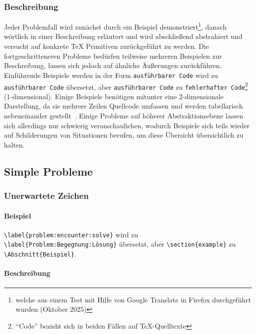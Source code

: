\subsubsection{Beschreibung}
Jeder Problemfall wird zunächst durch ein Beispiel demonstriert\footnote{welche aus einem Test mit Hilfe von Google Translate in Firefox durchgeführt wurden (Oktober 2025)}, danach wörtlich in einer Beschreibung erläutert und wird abschließend abstrahiert und versucht auf konkrete \TeX{} Primitiven zurückgeführt zu werden. Die fortgeschritteneren Probleme bedürfen teilweise mehreren Beispielen zur Beschreibung, lassen sich jedoch auf ähnliche Äußerungen zurückführen. Einführende Beispiele werden in der Form \texttt{ausführbarer Code} wird zu \texttt{ausführbarer Code} übersetzt, aber \texttt{ausführbarer Code} zu \texttt{fehlerhafter Code}\footnote{\enquote{Code} bezieht sich in beiden Fällen auf \TeX{}-Quelltexte} (1-dimensional). Einige Beispiele benötigen mitunter eine 2-dimensionale Darstellung, da sie mehrere Zeilen Quellcode umfassen und werden tabellarisch nebeneinander gestellt~. Einige Probleme auf höherer Abstraktionsebene lassen sich allerdings nur schwierig veranschaulichen, wodurch Beispiele sich teils wieder auf Schilderungen von Situationen berufen, um diese Übersicht übersichtlich zu halten.%

\subsection{Simple Probleme}\label{problems:simple}
\subsubsection{Unerwartete Zeichen}\label{problems:dim0}
\paragraph*{Beispiel}
\verb|\label{problem:encounter:solve}| wird zu \verb|\label{Problem:Begegnung:Lösung}| übersetzt, aber \verb|\section{example}| zu \verb|\Abschnitt{Beispiel}|.
\paragraph*{Beschreibung}
